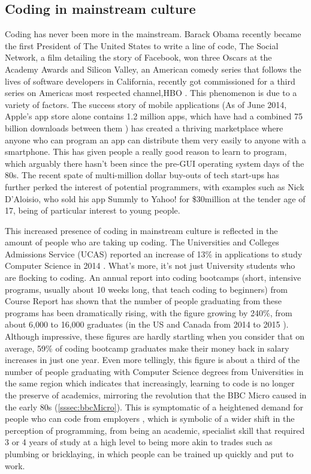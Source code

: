 \documentclass[ %
                    author={Jonathan Rankin},
                supervisor={Dr. David May, Dr. Ian Holyer},
                    degree={MEng},
                     title={CodeTouch},
                  subtitle={A Revolutionary Way To Program Real Code On Touch Screen Devices},
                      type={enterprise},
                      year={2015 } ]{dissertation}
\begin{document}
\subsection{Coding in mainstream culture} \label{ssec:learnCode}
Coding has never been more in the mainstream. Barack Obama recently became the first President of The United States to write a line of code\cite{Obama}, The Social Network, a film detailing the story of Facebook, won three Oscars at the Academy Awards \cite{socialNetwork} and Silicon Valley, an American comedy series that follows the lives of software developers in California, recently got commissioned for a third series \cite{thirdSeries} on Americas most respected channel,HBO \cite{HBO}. This phenomenon is due to a variety of factors. The success story of mobile applications (As of June 2014, Apple's app store alone contains 1.2 million apps, which have had a combined 75 billion downloads between them \cite{apple75}) has created a thriving marketplace where anyone who can program an app can distribute them very easily to anyone with a smartphone. This has given people a really good reason to learn to program, which arguably there hasn't been since the pre-GUI operating system days of the 80s. The recent spate of multi-million dollar buy-outs of tech start-ups has further perked the interest of potential programmers, with examples such as Nick D'Aloisio, who sold his app Summly to Yahoo! for \$30million at the tender age of 17\cite{summly}, being of particular interest to young people. 

This increased presence of coding in mainstream culture is reflected in the amount of people who are taking up coding. The Universities and Colleges Admissions Service (UCAS) reported an increase of 13\% in applications to study Computer Science in 2014 \cite{computerWeekly}. What's more, it's not just University students who are flocking to coding. An annual report into coding bootcamps (short, intensive programs, usually about 10 weeks long, that teach coding to beginners) from Course Report has shown that the number of people graduating from these programs has been dramatically rising, with the figure growing by 240\%, from about 6,000 to 16,000 graduates (in the US and Canada from 2014 to 2015 \cite{coursereport}). Although impressive, these figures are hardly startling when you consider that on average, 59\% of coding bootcamp graduates make their money back in salary increases in just one year\cite{switchUp}. Even more tellingly, this figure is about a third of the number of people graduating with Computer Science degrees from Universities in the same region \cite{coursereport} which indicates that increasingly, learning to code is no longer the preserve of academics, mirroring the revolution that the BBC Micro caused in the early 80s (\ref{sssec:bbcMicro}). This is symptomatic of a heightened demand for people who can code from employers \cite{22percent}, which is symbolic of a wider shift in the perception of programming, from being an academic, specialist skill that required 3 or 4 years of study at a high level to being more akin to trades such as plumbing or bricklaying, in which people can be trained up quickly and put to work. 
\end{document}
